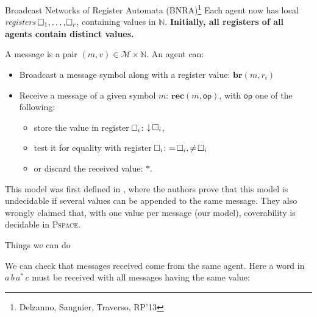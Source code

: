 \documentclass{beamer}
\newcommand{\messages}{\mathcal{M}}
\newcommand{\reg}{\hspace{-0.5mm}\square}
\begin{document}
\begin{frame}{Broadcast Networks of Register Automata (BNRA)\footnote{Delzanno, Sangnier, Traverso, RP'13}}
	Each agent now has local \emph{registers} $\reg_1, \ldots, \reg_r$, containing values in $\mathbb{N}$.
	\pause
	\textbf{Initially, all registers of all agents contain distinct values.}
	
	\pause
	\vspace{0.2cm}
	A message is a pair $(m, v) \in \messages \times \mathbb{N}$.
	An agent can:
	\begin{itemize}
		\item Broadcast a message symbol along with a register value: $\mathbf{br}(m, r_i)$\vspace{0.3cm}\pause
		
		
		\item Receive a message of a given symbol $m$: $\mathbf{rec}(m, \mathsf{op})$, with $\mathsf{op}$ one of the following:
		\begin{itemize}
			\item store the value in register $\reg_i$: $\downarrow \reg_i$,
			
			\item test it for equality with register $\reg_i$: $= \reg_i, \neq \reg_i$
			
			\item or discard the received value: $*$.
		\end{itemize}   
	\end{itemize}

	\pause
	This model was first defined in \footnotemark[3], where the authors prove that this model is undecidable if several values can be appended to the same message. They also wrongly claimed that, with one value per message (our model), coverability is decidable in \textsc{Pspace}.
\end{frame}

\begin{frame}{Things we can do}
	
	We can check that messages received come from the same agent.
	Here a word in $a \, b \, a^* \, c$ must be received with all messages having the same value: 
	\vspace{1cm}


	\centering
	
\end{frame}
\end{document}
